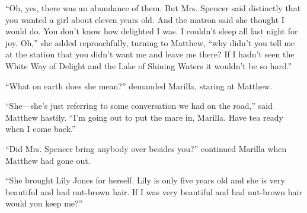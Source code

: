 \documentclass[a4paper]{article}
\begin{document}
``Oh, yes, there was an abundance of them. But Mrs. Spencer said distinctly that you wanted a girl about eleven years old. And the matron said she thought I would do. You don't know how delighted I was. I couldn't sleep all last night for joy. Oh,'' she added reproachfully, turning to Matthew, ``why didn't you tell me at the station that you didn't want me and leave me there? If I hadn't seen the White Way of Delight and the Lake of Shining Waters it wouldn't be so hard.''

{\LARGE ``What on earth does she mean?'' demanded Marilla, staring at Matthew.}

\small``She---she's just referring to some conversation we had on the road,'' said Matthew hastily. ``I'm going out to put the mare in, Marilla. Have tea ready when I come back.''

{\Large ``Did Mrs. Spencer bring anybody over besides you?'' continued Marilla when Matthew had gone out.

``She brought Lily Jones for herself. Lily is only five years old and she is very beautiful and had nut-brown hair. If I was very beautiful and had nut-brown hair would you keep me?''}
\end{document}
